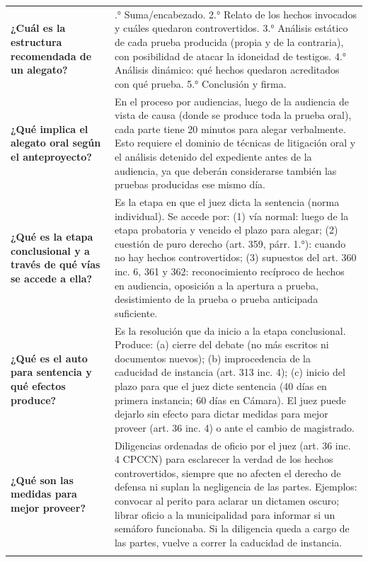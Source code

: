 \documentclass[12pt,oneside]{book}
\begin{document}
\begin{table}[H]
\begin{tabularx}{\textwidth}{
    >{\raggedright\arraybackslash}p{}
    >{\raggedright\arraybackslash}X
}
\textbf{¿Cuál es la estructura recomendada de un alegato?} &
1.° Suma/encabezado. 2.° Relato de los hechos invocados y cuáles quedaron controvertidos. 3.° Análisis estático de cada prueba producida (propia y de la contraria), con posibilidad de atacar la idoneidad de testigos. 4.° Análisis dinámico: qué hechos quedaron acreditados con qué prueba. 5.° Conclusión y firma. \\
\addlinespace

\textbf{¿Qué implica el alegato oral según el anteproyecto?} &
En el proceso por audiencias, luego de la audiencia de vista de causa (donde se produce toda la prueba oral), cada parte tiene 20 minutos para alegar verbalmente. Esto requiere el dominio de técnicas de litigación oral y el análisis detenido del expediente antes de la audiencia, ya que deberán considerarse también las pruebas producidas ese mismo día. \\
\addlinespace

\textbf{¿Qué es la etapa conclusional y a través de qué vías se accede a ella?} &
Es la etapa en que el juez dicta la sentencia (norma individual). Se accede por: (1) vía normal: luego de la etapa probatoria y vencido el plazo para alegar; (2) cuestión de puro derecho (art. 359, párr. 1.°): cuando no hay hechos controvertidos; (3) supuestos del art. 360 inc. 6, 361 y 362: reconocimiento recíproco de hechos en audiencia, oposición a la apertura a prueba, desistimiento de la prueba o prueba anticipada suficiente. \\
\addlinespace

\textbf{¿Qué es el auto para sentencia y qué efectos produce?} &
Es la resolución que da inicio a la etapa conclusional. Produce: (a) cierre del debate (no más escritos ni documentos nuevos); (b) improcedencia de la caducidad de instancia (art. 313 inc. 4); (c) inicio del plazo para que el juez dicte sentencia (40 días en primera instancia; 60 días en Cámara). El juez puede dejarlo sin efecto para dictar medidas para mejor proveer (art. 36 inc. 4) o ante el cambio de magistrado. \\
\addlinespace

\textbf{¿Qué son las medidas para mejor proveer?} &
Diligencias ordenadas de oficio por el juez (art. 36 inc. 4 CPCCN) para esclarecer la verdad de los hechos controvertidos, siempre que no afecten el derecho de defensa ni suplan la negligencia de las partes. Ejemplos: convocar al perito para aclarar un dictamen oscuro; librar oficio a la municipalidad para informar si un semáforo funcionaba. Si la diligencia queda a cargo de las partes, vuelve a correr la caducidad de instancia. \\
\addlinespace


\end{tabularx}
\end{table}
\end{document}
